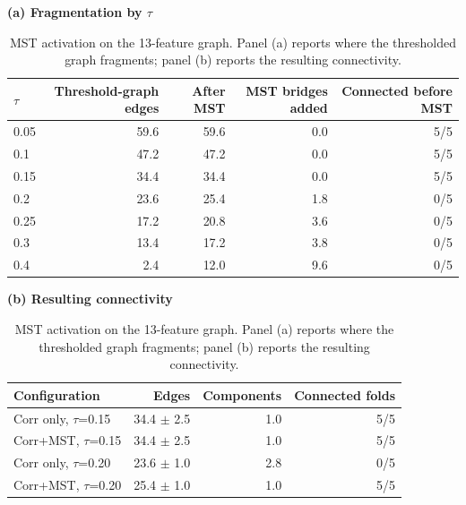 \begin{table}[t]
\centering
\caption{MST activation on the 13-feature graph. Panel (a) reports where the thresholded graph fragments; panel (b) reports the resulting connectivity.}
\label{tab:mstactivation}
\label{tab:mstconn}
\footnotesize
\textbf{(a) Fragmentation by $\tau$}\\[2pt]
\begin{tabular}{lrrrr}
\toprule
$\tau$ & Threshold-graph edges & After MST & MST bridges added & Connected before MST \\
\midrule
0.05 & 59.6 & 59.6 & 0.0 & 5/5 \\
0.1 & 47.2 & 47.2 & 0.0 & 5/5 \\
0.15 & 34.4 & 34.4 & 0.0 & 5/5 \\
0.2 & 23.6 & 25.4 & 1.8 & 0/5 \\
0.25 & 17.2 & 20.8 & 3.6 & 0/5 \\
0.3 & 13.4 & 17.2 & 3.8 & 0/5 \\
0.4 & 2.4 & 12.0 & 9.6 & 0/5 \\
\bottomrule
\end{tabular}
\vspace{7pt}
\textbf{(b) Resulting connectivity}\\[2pt]
\begin{tabular}{lrrr}
\toprule
Configuration & Edges & Components & Connected folds \\
\midrule
Corr only, $\tau$=0.15 & 34.4 $\pm$ 2.5 & 1.0 & 5/5 \\
Corr+MST, $\tau$=0.15 & 34.4 $\pm$ 2.5 & 1.0 & 5/5 \\
Corr only, $\tau$=0.20 & 23.6 $\pm$ 1.0 & 2.8 & 0/5 \\
Corr+MST, $\tau$=0.20 & 25.4 $\pm$ 1.0 & 1.0 & 5/5 \\
\bottomrule
\end{tabular}
\end{table}
